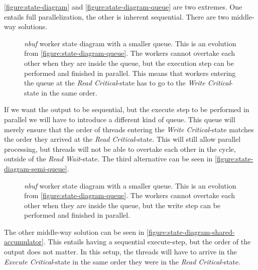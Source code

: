 \documentclass[a4paper]{article}
\newcommand{\nbuf}{\textit{nbuf} }
\begin{document}
\autoref{figure:state-diagram} and \autoref{figure:state-diagram-queue} are two extremes. One entails full parallelization, the other is inherent sequential. There are two middle-way solutions. 

\begin{figure}
	\begin{adjustwidth}{-0.5in}{-0.5in}
    \centering
    \def\svgwidth{\columnwidth}
    
  	\caption{\nbuf worker state diagram with a smaller queue. This is an evolution from \autoref{figure:state-diagram-queue}. The workers cannot overtake each other when they are inside the queue, but the execution step can be performed and finished in parallel. This means that workers entering the queue at the \textit{Read Critical}-state has to go to the \textit{Write Critical}-state in the same order.}
	\label{figure:state-diagram-semi-queue}
	\end{adjustwidth}
\end{figure}

If we want the output to be sequential, but the execute step to be performed in parallel we will have to introduce a different kind of queue. This queue will merely ensure that the order of threads entering the \textit{Write Critical}-state matches the order they arrived at the \textit{Read Critical}-state. This will still allow parallel processing, but threads will not be able to overtake each other in the cycle, outside of the \textit{Read Wait}-state. The third alternative can be seen in \autoref{figure:state-diagram-semi-queue}.

\begin{figure}
	\begin{adjustwidth}{-0.5in}{-0.5in}
    \centering
    \def\svgwidth{\columnwidth}
    
  	\caption{\nbuf worker state diagram with a smaller queue. This is an evolution from \autoref{figure:state-diagram-queue}. The workers cannot overtake each other when they are inside the queue, but the write step can be performed and finished in parallel.}
	\label{figure:state-diagram-shared-accumulator}
	\end{adjustwidth}
\end{figure}

The other middle-way solution can be seen in \autoref{figure:state-diagram-shared-accumulator}. This entails having a sequential execute-step, but the order of the output does not matter. In this setup, the threads will have to arrive in the \textit{Execute Critical}-state in the same order they were in the \textit{Read Critical}-state.\\\\
\end{document}

